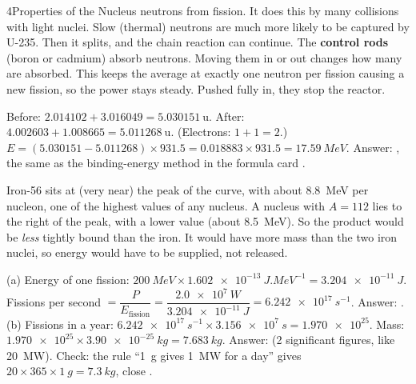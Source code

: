 \begin{chapteranswers}{4}{Properties of the Nucleus}
        neutrons from fission. It does this by many collisions with light nuclei.
        Slow (thermal) neutrons are much more likely to be captured by U-235. Then it
        splits, and the chain reaction can continue. The \textbf{control rods} (boron
        or cadmium) absorb neutrons. Moving them in or out changes how many are
        absorbed. This keeps the average at exactly one neutron per fission causing a
        new fission, so the power stays steady. Pushed fully in, they stop the
        reactor.
  \item Before: $2.014102 + 3.016049 = \qty{5.030151}{\amu}$. After:
        $4.002603 + 1.008665 = \qty{5.011268}{\amu}$. (Electrons: $1 + 1 = 2$.)
        $E = (5.030151 - 5.011268) \times 931.5 = 0.018883 \times 931.5 = \qty{17.59}{MeV}$.
        Answer: , the same as the binding-energy method in
        the formula card \cmark.
  \item Iron-56 sits at (very near) the peak of the curve, with about \qty{8.8}{MeV}
        per nucleon, one of the highest values of any nucleus. A nucleus with
        $A = 112$ lies to the right of the
        peak, with a lower value (about \qty{8.5}{MeV}). So the product would be
        \emph{less} tightly bound than the iron. It would have more mass than the two
        iron nuclei, so energy would have to be supplied, not released.
  \item (a) Energy of one fission:
        $\qty{200}{MeV} \times \qty{1.602e-13}{J.MeV^{-1}} = \qty{3.204e-11}{J}$.
        Fissions per second $= \dfrac{P}{E_\mathrm{fission}}
        = \dfrac{\qty{2.0e7}{W}}{\qty{3.204e-11}{J}} = \qty{6.242e17}{s^{-1}}$.
        Answer: .\newline
        (b) Fissions in a year:
        $\qty{6.242e17}{s^{-1}} \times \qty{3.156e7}{s} = \num{1.970e25}$.
        Mass: $\num{1.970e25} \times \qty{3.90e-25}{kg} = \qty{7.683}{kg}$.
        Answer:  (2 significant figures, like \qty{20}{MW}).
        Check: the rule ``\qty{1}{g} gives \qty{1}{MW} for a day'' gives
        $20 \times 365 \times \qty{1}{g} = \qty{7.3}{kg}$, close \cmark.
\end{chapteranswers}
